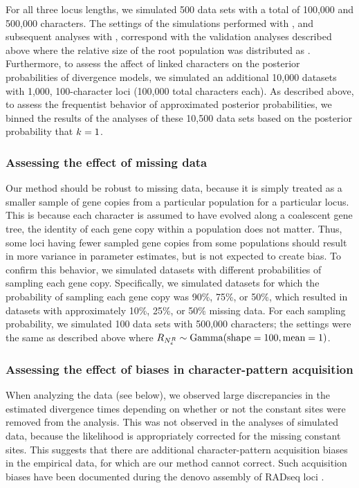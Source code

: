 For all three locus lengths, we simulated 500 data sets with a total of 100,000
and 500,000 characters.
The settings of the simulations performed with \simcoevolity, and subsequent
analyses with \ecoevolity, correspond with the validation analyses described
above where the relative size of the root population was distributed as
.
Furthermore, to assess the affect of linked characters on the posterior
probabilities of divergence models, we simulated an additional 10,000 datasets
with 1,000, 100-character loci (100,000 total characters each).
As described above, to assess the frequentist behavior of approximated
posterior probabilities, we binned the results of the analyses of these 10,500
data sets based on the posterior probability that $k_{} = 1$.

\subsubsection{Assessing the effect of missing data}
Our method should be robust to missing data, because it is simply treated as a
smaller sample of gene copies from a particular population for a particular
locus.
This is because each character is assumed to have evolved along a coalescent
gene tree, the identity of each gene copy within a population does not matter.
Thus, some loci having fewer sampled gene copies from some populations should
result in more variance in parameter estimates, but is not expected to create
bias.
To confirm this behavior, we simulated datasets with different probabilities of
sampling each gene copy.
Specifically, we simulated datasets for which the probability of sampling each
gene copy was 90\%, 75\%, or 50\%, which resulted in datasets with
approximately 10\%, 25\%, or 50\% missing data.
For each sampling probability, we simulated 100 data sets with 500,000
characters; the settings were the same as described above where
$R_{N_{e}^{R{}}} \sim \textrm{Gamma}(\textrm{shape} = 100, \textrm{mean} = 1)$.

\subsubsection{Assessing the effect of biases in character-pattern acquisition}
When analyzing the  data (see below), we observed large
discrepancies in the estimated divergence times depending on whether or not the
constant sites were removed from the analysis.
This was not observed in the analyses of simulated data, because the likelihood
is appropriately corrected for the missing constant sites.
This suggests that there are additional character-pattern acquisition biases in
the empirical data, for which are our method cannot correct.
Such acquisition biases have been documented during the denovo assembly of
RADseq loci \citep{Harvey2015,Linck2017}.

